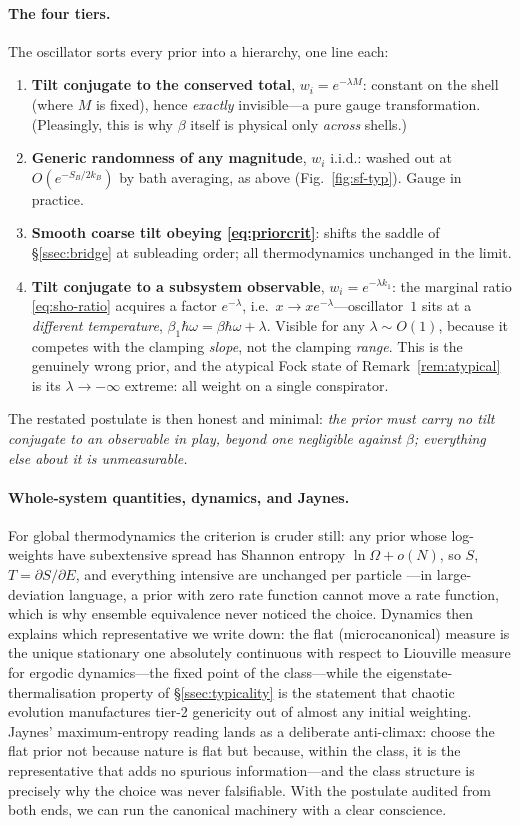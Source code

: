 \documentclass[11pt,a4paper]{article}
\theoremstyle{definition}
\begin{document}
\paragraph{The four tiers.} The oscillator sorts every prior into a hierarchy,
one line each:
\begin{enumerate}
\item \textbf{Tilt conjugate to the conserved total}, $w_i=e^{-\lambda M}$:
constant on the shell (where $M$ is fixed), hence \emph{exactly} invisible---a
pure gauge transformation. (Pleasingly, this is why $\beta$ itself is physical
only \emph{across} shells.)
\item \textbf{Generic randomness of any magnitude}, $w_i$ i.i.d.: washed out
at $O(e^{-S_B/2k_B})$ by bath averaging, as above (Fig.~\ref{fig:sf-typ}).
Gauge in practice.
\item \textbf{Smooth coarse tilt obeying \eqref{eq:priorcrit}}: shifts the
saddle of \S\ref{ssec:bridge} at subleading order; all thermodynamics
unchanged in the limit.
\item \textbf{Tilt conjugate to a subsystem observable},
$w_i=e^{-\lambda k_1}$: the marginal ratio \eqref{eq:sho-ratio} acquires a
factor $e^{-\lambda}$, i.e.\ $x\to xe^{-\lambda}$---oscillator~$1$ sits at a
\emph{different temperature}, $\beta_1\hbar\omega=\beta\hbar\omega+\lambda$.
Visible for any $\lambda\sim O(1)$, because it competes with the clamping
\emph{slope}, not the clamping \emph{range}. This is the genuinely wrong
prior, and the atypical Fock state of Remark~\ref{rem:atypical} is its
$\lambda\to-\infty$ extreme: all weight on a single conspirator.
\end{enumerate}
The restated postulate is then honest and minimal: \emph{the prior must carry
no tilt conjugate to an observable in play, beyond one negligible against
$\beta$; everything else about it is unmeasurable.}

\paragraph{Whole-system quantities, dynamics, and Jaynes.} For global
thermodynamics the criterion is cruder still: any prior whose log-weights
have subextensive spread has Shannon entropy $\ln\Omega+o(N)$, so $S$,
$T=\partial S/\partial E$, and everything intensive are unchanged per particle
---in large-deviation language, a prior with zero rate function cannot move a
rate function, which is why ensemble equivalence never noticed the choice.
Dynamics then explains which representative we write down: the flat
(microcanonical) measure is the unique stationary one absolutely continuous
with respect to Liouville measure for ergodic dynamics---the fixed point of
the class---while the eigenstate-thermalisation property of
\S\ref{ssec:typicality} is the statement that chaotic evolution manufactures
tier-2 genericity out of almost any initial weighting.
Jaynes' maximum-entropy reading lands as a deliberate anti-climax: choose the
flat prior not because nature is flat but because, within the class, it is the
representative that adds no spurious information---and the class structure is
precisely why the choice was never falsifiable. With the postulate audited
from both ends, we can run the canonical machinery with a clear conscience.
\end{document}
